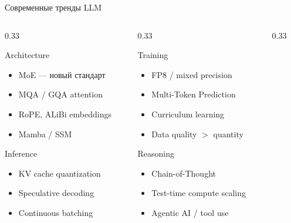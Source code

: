 \documentclass[aspectratio=169, 8pt]{beamer}
\begin{document}
\begin{frame}{Современные тренды LLM}
  \begin{columns}[T]
    \begin{column}{0.33\textwidth}
      \begin{block}{Architecture}
        \begin{itemize}\small
          \item MoE --- новый стандарт
          \item MQA / GQA attention
          \item RoPE, ALiBi embeddings
          \item Mamba / SSM
        \end{itemize}
      \end{block}
      \begin{block}{Inference}
        \begin{itemize}\small
          \item KV cache quantization
          \item Speculative decoding
          \item Continuous batching
        \end{itemize}
      \end{block}
    \end{column}
    \begin{column}{0.33\textwidth}
      \begin{block}{Training}
        \begin{itemize}\small
          \item FP8 / mixed precision
          \item Multi-Token Prediction
          \item Curriculum learning
          \item Data quality $>$ quantity
        \end{itemize}
      \end{block}
      \begin{block}{Reasoning}
        \begin{itemize}\small
          \item Chain-of-Thought
          \item Test-time compute scaling
          \item Agentic AI / tool use
        \end{itemize}
      \end{block}
    \end{column}
    \begin{column}{0.33\textwidth}

\end{column}
\end{columns}
\end{frame}
\end{document}
